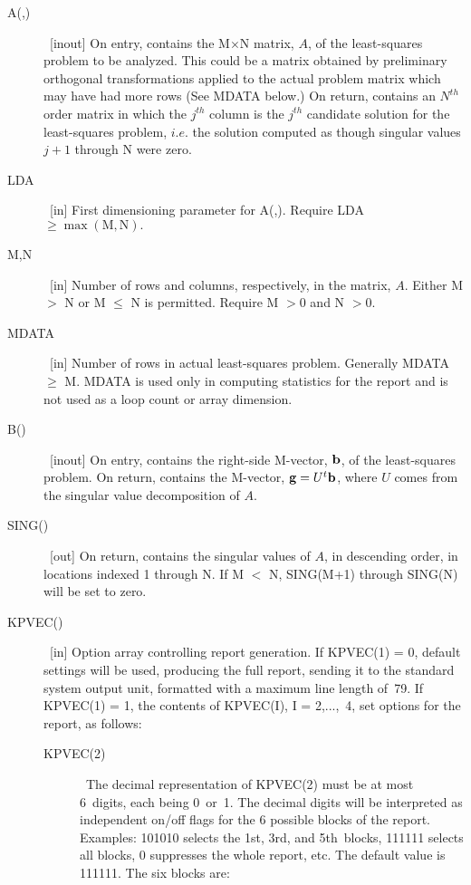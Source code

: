 \documentclass[twoside]{MATH77}
\begin{document}
\begin{description}
\item[A(,)]  \ [inout] On entry, contains the M$\times $N matrix, $A$, of the
least-squares problem to be analyzed. This could be a matrix obtained by
preliminary orthogonal transformations applied to the actual problem matrix
which may have had more rows (See MDATA below.) On return, contains an $%
N^{th}$ order matrix in which the $j^{th}$ column is the $j^{th}$ candidate
solution for the least-squares problem, $i.e$. the solution computed as
though singular values $j+1$ through N were zero.

\item[LDA]  \ [in] First dimensioning parameter for A(,). Require LDA $\geq
\max (\text{M},\text{N}).$

\item[M,N]  \ [in] Number of rows and columns, respectively, in the matrix, $A$.
Either M $>$ N or M $\leq $ N is permitted. Require M $>0$ and N $>0.$

\item[MDATA]  \ [in] Number of rows in actual least-squares problem.
Generally MDATA\ $\geq $ M. MDATA is used only in computing statistics for
the report and is not used as a loop count or array dimension.

\item[B()]  \ [inout] On entry, contains the right-side M-vector, ${\bf b}$,
of the least-squares problem. On return, contains the M-vector, ${\bf g}=U^t%
{\bf b}$, where $U$ comes from the singular value decomposition of $A$.

\item[SING()]  \ [out] On return, contains the singular values of $A$, in
descending order, in locations indexed 1 through N. If M $<$ N, SING(M+1)
through SING(N) will be set to zero.

\item[KPVEC()]  \ [in] Option array controlling report generation. If
KPVEC(1) = 0, default settings will be used, producing the full report,
sending it to the standard system output unit, formatted with a maximum line
length of~79. If KPVEC(1) = 1, the contents of KPVEC(I), I = 2,...,~4, set
options for the report, as follows:
\begin{description}
\item[KPVEC(2)] \ The decimal representation of KPVEC(2) must be at
most 6~digits, each being 0~or~1. The decimal digits will be interpreted as
independent on/off flags for the 6 possible blocks of the report. Examples:
101010 selects the 1st, 3rd, and 5th~blocks, 111111 selects all blocks, 0
suppresses the whole report, etc. The default value is 111111. The six
blocks are:


\end{description}
\end{description}
\end{document}
